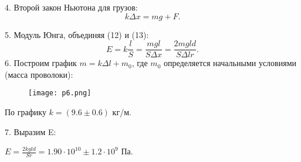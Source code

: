 4. Второй закон Ньютона для грузов:
\begin{equation}
    k\Delta x = mg + F.
\end{equation}

5. Модуль Юнга, объединяя (12) и (13):
\begin{equation}
    E = k\frac lS = \frac{mgl}{S\Delta x} = \frac{2mgld}{S\Delta lr}.
\end{equation}
6. Построим график $m = k\Delta l + m_0$, где $m_0$
определяется начальными условиями (масса проволоки):
\begin{figure}[H]
    \centering
\texttt{[image: p6.png]}
    \label{fig:my_label}
\end{figure}
По графику $k = (9.6 \pm 0.6)$ кг/м.

7. Выразим E:
\begin{center}
$E = \frac{2kgld}{Sr} = 1.90 \cdot 10^{10} \pm 1.2 \cdot 10^9$ Па.
\end{center}
